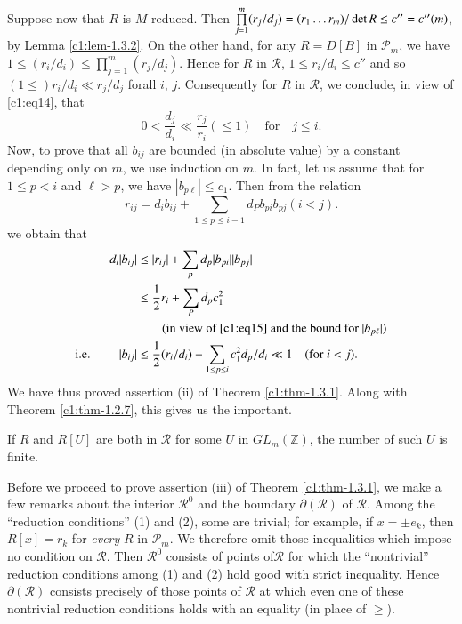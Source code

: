 Suppose now that $R$ is $M$-reduced. Then
$\prod\limits^{m}_{j=1}(r_{j}/d_{j})=(r_{1}\ldots r_{m})/\det\break R\leq
c''=c''(m)$, by Lemma \ref{c1:lem-1.3.2}. On the other hand, for any
$R=D[B]$ in $\mathscr{P}_{m}$, we have $1\leq (r_{i}/d_{i})\leq
\prod\limits^{m}_{j=1}(r_{j}/d_{j})$. Hence for $R$ in $\mathscr{R}$,
$1\leq r_{i}/d_{i}\leq c''$ and so $(1\leq)r_{i}/d_{i}\ll r_{j}/d_{j}$
for\pageoriginale all $i$, $j$. Consequently for $R$ in $\mathscr{R}$,
we conclude, in view of \eqref{c1:eq14}, that
$$
0<\frac{d_{j}}{d_{i}}\ll \frac{r_{j}}{r_{i}}(\leq
1)\quad\text{for}\quad j\leq i.
$$
Now, to prove that all $b_{ij}$ are bounded (in absolute value) by a
constant depending only on $m$, we use induction on $m$. In fact, let
us assume that for $1\leq p < i$ and $\ell>p$, we have $|b_{p\ell}|\leq
c_{1}$. Then from the relation 
$$
r_{ij}=d_{i}b_{ij}+\sum\limits_{1\leq p\leq
  i-1}d_{P}b_{pi}b_{pj}(i<j).
$$
we obtain that
\begin{align*}
d_{i}|b_{ij}| &\leq |r_{ij}|+\sum_{p}d_{p}|b_{pi}||b_{pj}|\\
&\leq \frac{1}{2}r_{i}+\sum_{P}d_{p}c^{2}_{1}\\
&\qquad \text{(in view of \eqref{c1:eq15} and the bound for
  $|b_{p\ell}|$)}\\
\text{{i.e.}\kern.3em}\qquad |b_{ij}| &\leq \frac{1}{2}(r_{i}/d_{i})+\sum\limits_{1\leq p\leq
  i}c^{2}_{1}d_{p}/d_{i}\ll 1 \quad (\text{for } i<j).
\end{align*}
We have thus proved assertion (ii) of Theorem \ref{c1:thm-1.3.1}. Along
with Theorem \ref{c1:thm-1.2.7}, this gives us the important.

\begin{coro*}
If $R$ and $R[U]$ are both in $\mathscr{R}$ for some $U$ in
$GL_{m}(\mathbb{Z})$, the number of such $U$ is finite.
\end{coro*}

Before we proceed to prove assertion (iii) of Theorem \ref{c1:thm-1.3.1},
we make a few remarks about the interior $\mathscr{R}^{0}$ and the
boundary $\partial(\mathscr{R})$ of $\mathscr{R}$. Among the
``reduction conditions'' (1) and (2), some are trivial; for example,
if $x=\pm e_{k}$, then $R[x]=r_{k}$ for {\em every} $R$ in
$\mathscr{P}_{m}$. We therefore omit those inequalities which impose
no condition on $\mathscr{R}$. Then $\mathscr{R}^{0}$ consists of
points of\pageoriginale $\mathscr{R}$ for which the ``nontrivial''
reduction conditions among (1) and (2) hold good with strict
inequality. Hence $\partial(\mathscr{R})$ consists precisely of those
points of $\mathscr{R}$ at which even one of these nontrivial
reduction conditions holds with an equality (in place of $\geq$).

